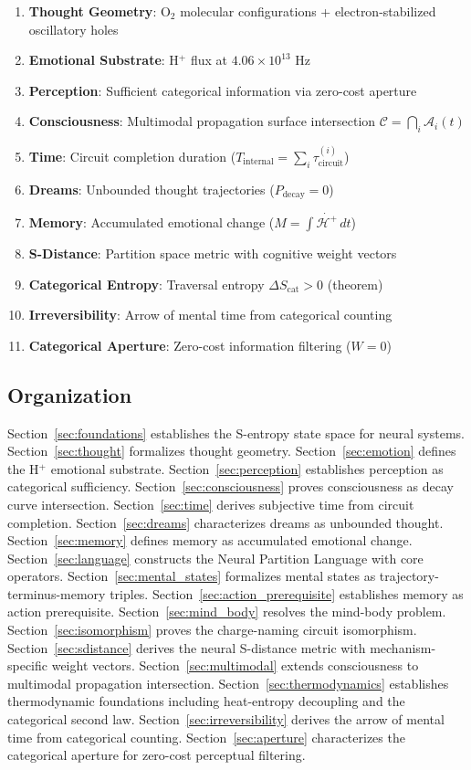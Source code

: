 \documentclass[aps,prd,twocolumn,superscriptaddress,floatfix,nofootinbib]{revtex4-2}
\theoremstyle{remark}
\newcommand{\Ccat}{\mathcal{C}}
\newcommand{\Hfield}{\mathcal{H}^+}
\newcommand{\Pdecay}{P_{\mathrm{decay}}}
\newcommand{\Scatent}{S_{\mathrm{cat}}}
\begin{document}
\begin{enumerate}
\item \textbf{Thought Geometry}: O$_2$ molecular configurations + electron-stabilized oscillatory holes
\item \textbf{Emotional Substrate}: H$^+$ flux at $4.06 \times 10^{13}$ Hz
\item \textbf{Perception}: Sufficient categorical information via zero-cost aperture
\item \textbf{Consciousness}: Multimodal propagation surface intersection $\Ccat = \bigcap_i \mathcal{A}_i(t)$
\item \textbf{Time}: Circuit completion duration ($T_{\mathrm{internal}} = \sum_i \tau_{\mathrm{circuit}}^{(i)}$)
\item \textbf{Dreams}: Unbounded thought trajectories ($\Pdecay = 0$)
\item \textbf{Memory}: Accumulated emotional change ($M = \int \dot{\Hfield} \, dt$)
\item \textbf{S-Distance}: Partition space metric with cognitive weight vectors
\item \textbf{Categorical Entropy}: Traversal entropy $\Delta \Scatent > 0$ (theorem)
\item \textbf{Irreversibility}: Arrow of mental time from categorical counting
\item \textbf{Categorical Aperture}: Zero-cost information filtering ($W = 0$)
\end{enumerate}

\subsection{Organization}

Section~\ref{sec:foundations} establishes the S-entropy state space for neural systems. Section~\ref{sec:thought} formalizes thought geometry. Section~\ref{sec:emotion} defines the H$^+$ emotional substrate. Section~\ref{sec:perception} establishes perception as categorical sufficiency. Section~\ref{sec:consciousness} proves consciousness as decay curve intersection. Section~\ref{sec:time} derives subjective time from circuit completion. Section~\ref{sec:dreams} characterizes dreams as unbounded thought. Section~\ref{sec:memory} defines memory as accumulated emotional change. Section~\ref{sec:language} constructs the Neural Partition Language with core operators. Section~\ref{sec:mental_states} formalizes mental states as trajectory-terminus-memory triples. Section~\ref{sec:action_prerequisite} establishes memory as action prerequisite. Section~\ref{sec:mind_body} resolves the mind-body problem. Section~\ref{sec:isomorphism} proves the charge-naming circuit isomorphism. Section~\ref{sec:sdistance} derives the neural S-distance metric with mechanism-specific weight vectors. Section~\ref{sec:multimodal} extends consciousness to multimodal propagation intersection. Section~\ref{sec:thermodynamics} establishes thermodynamic foundations including heat-entropy decoupling and the categorical second law. Section~\ref{sec:irreversibility} derives the arrow of mental time from categorical counting. Section~\ref{sec:aperture} characterizes the categorical aperture for zero-cost perceptual filtering.
\end{document}
